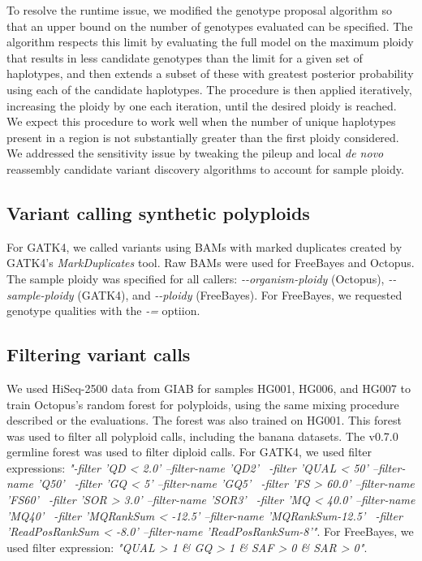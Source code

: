 \documentclass[notitlepage, twocolumn, 10pt]{article}
\begin{document}
To resolve the runtime issue, we modified the genotype proposal algorithm so that an upper bound on the number of genotypes evaluated can be specified. The algorithm respects this limit by evaluating the full model on the maximum ploidy that results in less candidate genotypes than the limit for a given set of haplotypes, and then extends a subset of these with greatest posterior probability using each of the candidate haplotypes. The procedure is then applied iteratively, increasing the ploidy by one each iteration, until the desired ploidy is reached. We expect this procedure to work well when the number of unique haplotypes present in a region is not substantially greater than the first ploidy considered. We addressed the sensitivity issue by tweaking the pileup and local \emph{de novo} reassembly candidate variant discovery algorithms to account for sample ploidy.

\subsection*{Variant calling synthetic polyploids} For GATK4, we called variants using BAMs with marked duplicates created by GATK4's \emph{MarkDuplicates} tool. Raw BAMs were used for FreeBayes and Octopus. The sample ploidy was specified for all callers: \emph{-{}-organism-ploidy} (Octopus), \emph{-{}-sample-ploidy} (GATK4), and \emph{-{}-ploidy} (FreeBayes). For FreeBayes, we requested genotype qualities with the \emph{-=} optiion.

\subsection*{Filtering variant calls} We used HiSeq-2500 data from GIAB for samples HG001, HG006, and HG007 to train Octopus's random forest for polyploids, using the same mixing procedure described or the evaluations. The forest was also trained on HG001. This forest was used to filter all polyploid calls, including the banana datasets. The v0.7.0 germline forest was used to filter diploid calls.
For GATK4, we used filter expressions: \emph{"-filter 'QD < 2.0' --filter-name 'QD2' \
		 -filter 'QUAL < 50' --filter-name 'Q50' \
		 -filter 'GQ < 5' --filter-name 'GQ5' \
		 -filter 'FS > 60.0' --filter-name 'FS60' \
		 -filter 'SOR > 3.0' --filter-name 'SOR3' \
		 -filter 'MQ < 40.0' --filter-name 'MQ40' \
		 -filter 'MQRankSum < -12.5' --filter-name 'MQRankSum-12.5' \
		 -filter 'ReadPosRankSum < -8.0' --filter-name 'ReadPosRankSum-8'"}.
For FreeBayes, we used filter expression: \emph{"QUAL > 1 \& GQ > 1 \& SAF > 0 \& SAR > 0"}.
\end{document}
